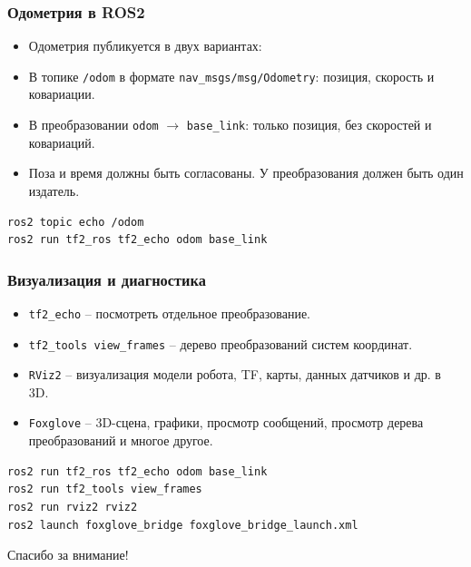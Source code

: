 \documentclass[aspectratio=169]{beamer}
\newcommand{\cmd}[1]{\textcolor{HSEblue}{\texttt{#1}}}
\begin{document}
\begin{frame}[fragile]
\frametitle{Одометрия в ROS2}
\small
\begin{itemize}
  \item Одометрия публикуется в двух вариантах:

  \item В топике \cmd{/odom} в формате \cmd{nav\_msgs/msg/Odometry}: позиция, скорость и ковариации.
  \item В преобразовании \cmd{odom} $\to$ \cmd{base\_link}: только позиция, без скоростей и ковариаций.
  \item Поза и время должны быть согласованы. У преобразования должен быть один издатель.
\end{itemize}
\vfill
\begin{center}
\begin{minipage}{0.9\textwidth}
\begin{lstlisting}[basicstyle=\color{HSEblue}\ttfamily\footnotesize]
ros2 topic echo /odom
ros2 run tf2_ros tf2_echo odom base_link
\end{lstlisting}
\end{minipage}
\end{center}
\vfill
\end{frame}

\begin{frame}[fragile]
\frametitle{Визуализация и диагностика}
\small
\begin{itemize}
  \item \cmd{tf2\_echo} -- посмотреть отдельное преобразование.
  \item \cmd{tf2\_tools view\_frames} -- дерево преобразований систем координат. 
  \item \cmd{RViz2} -- визуализация модели робота, TF, карты, данных датчиков и др. в 3D.
  \item \cmd{Foxglove} -- 3D-сцена, графики,  просмотр сообщений, просмотр дерева преобразований и многое другое.
\end{itemize}
\vfill
\begin{center}
\begin{minipage}{0.9\textwidth}
\begin{lstlisting}[basicstyle=\color{HSEblue}\ttfamily\footnotesize]
ros2 run tf2_ros tf2_echo odom base_link
ros2 run tf2_tools view_frames
ros2 run rviz2 rviz2
ros2 launch foxglove_bridge foxglove_bridge_launch.xml
\end{lstlisting}
\end{minipage}
\end{center}
\vfill
\end{frame}

\begin{frame}[fragile]
\begin{center}
\Large Спасибо за внимание!
\end{center}
\vfill
\end{frame}
\end{document}
